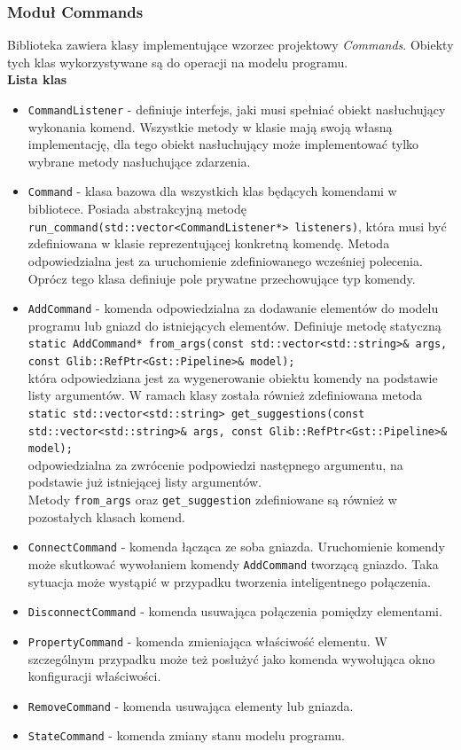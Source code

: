 \documentclass[12pt]{article}
\begin{document}
\subsubsection{Moduł Commands}
Biblioteka zawiera klasy implementujące wzorzec projektowy \textit{Commands}. Obiekty tych klas wykorzystywane są do operacji na modelu programu.\\
\textbf{Lista klas}
\begin{itemize}
 \setlength{\itemsep}{0em}
\item \texttt{CommandListener} - definiuje interfejs, jaki musi spełniać obiekt nasłuchujący wykonania komend. Wszystkie metody w klasie mają swoją własną implementację, dla tego obiekt nasłuchujący może implementować tylko wybrane metody nasłuchujące zdarzenia.
\item \texttt{Command} - klasa bazowa dla wszystkich klas będących komendami w bibliotece. Posiada abstrakcyjną metodę \texttt{run\_command(std::vector<CommandListener*> listeners)}, która musi być zdefiniowana w klasie reprezentującej konkretną komendę. Metoda odpowiedzialna jest za uruchomienie zdefiniowanego wcześniej polecenia. Oprócz tego klasa definiuje pole prywatne przechowujące typ komendy.
\item \texttt{AddCommand} - komenda odpowiedzialna za dodawanie elementów do modelu programu lub gniazd do istniejących elementów. Definiuje metodę statyczną \\
\texttt{static AddCommand* from\_args(const std::vector<std::string>\& args, const Glib::RefPtr<Gst::Pipeline>\& model);}\\
która odpowiedziana jest za wygenerowanie obiektu komendy na podstawie listy argumentów.
W ramach klasy została również zdefiniowana metoda \\
\texttt{static std::vector<std::string> get\_suggestions(const std::vector<std::string>\& args, const Glib::RefPtr<Gst::Pipeline>\& model);}\\
odpowiedzialna za zwrócenie podpowiedzi następnego argumentu, na podstawie już istniejącej listy argumentów.\\
Metody \texttt{from\_args} oraz \texttt{get\_suggestion} zdefiniowane są również w pozostałych klasach komend.
\item \texttt{ConnectCommand} - komenda łącząca ze soba gniazda. Uruchomienie komendy może skutkować wywołaniem komendy \texttt{AddCommand} tworzącą gniazdo. Taka sytuacja może wystąpić w przypadku tworzenia inteligentnego połączenia.
\item \texttt{DisconnectCommand} - komenda usuwająca połączenia pomiędzy elementami.
\item \texttt{PropertyCommand} - komenda zmieniająca właściwość elementu. W szczególnym przypadku może też posłużyć jako komenda wywołująca okno konfiguracji właściwości.
\item \texttt{RemoveCommand} - komenda usuwająca elementy lub gniazda.
\item \texttt{StateCommand} - komenda zmiany stanu modelu programu.
\end{itemize}
\end{document}
